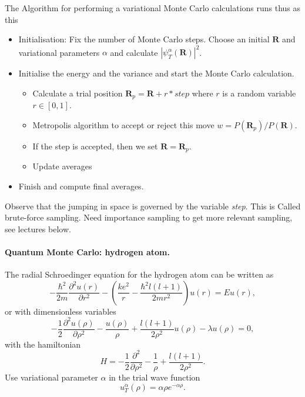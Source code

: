 The Algorithm for performing a variational Monte Carlo calculations runs thus as this

\begin{itemize}
   \item Initialisation: Fix the number of Monte Carlo steps. Choose an initial $\bm{R}$ and variational parameters $\alpha$ and calculate $\left|\psi_T^{\alpha}(\bm{R})\right|^2$. 

   \item Initialise the energy and the variance and start the Monte Carlo calculation.
\begin{itemize}

      \item Calculate  a trial position  $\bm{R}_p=\bm{R}+r*step$ where $r$ is a random variable $r \in [0,1]$.

      \item Metropolis algorithm to accept or reject this move  $w = P(\bm{R}_p)/P(\bm{R})$.

      \item If the step is accepted, then we set $\bm{R}=\bm{R}_p$. 

      \item Update averages

\end{itemize}

\noindent
   \item Finish and compute final averages.
\end{itemize}

\noindent
Observe that the jumping in space is governed by the variable \emph{step}. This is Called brute-force sampling.
Need importance sampling to get more relevant sampling, see lectures below.

\paragraph{Quantum Monte Carlo: hydrogen atom.}
The radial Schroedinger equation for the hydrogen atom can be
written as
\[
-\frac{\hbar^2}{2m}\frac{\partial^2 u(r)}{\partial r^2}-
\left(\frac{ke^2}{r}-\frac{\hbar^2l(l+1)}{2mr^2}\right)u(r)=Eu(r),
\]
or with dimensionless variables
\[
-\frac{1}{2}\frac{\partial^2 u(\rho)}{\partial \rho^2}-
\frac{u(\rho)}{\rho}+\frac{l(l+1)}{2\rho^2}u(\rho)-\lambda u(\rho)=0,
\label{eq:hydrodimless1}
\]
with the hamiltonian
\[
H=-\frac{1}{2}\frac{\partial^2 }{\partial \rho^2}-
\frac{1}{\rho}+\frac{l(l+1)}{2\rho^2}.
\]
Use variational parameter $\alpha$ in the trial
wave function 
\[
   u_T^{\alpha}(\rho)=\alpha\rho e^{-\alpha\rho}. 
   \label{eq:trialhydrogen}
\]

